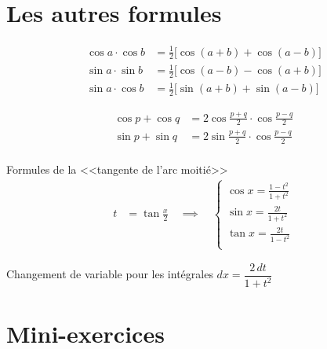 \section{Les autres formules}


\begin{frame}

\begin{align*}
\cos a\cdot\cos b &= \frac{1}{2}\big[ \cos(a+b)+\cos(a-b)\big]\\
\sin a\cdot\sin b &= \frac{1}{2}\big[ \cos(a-b)-\cos(a+b)\big]\\
\sin a\cdot\cos b &= \frac{1}{2}\big[ \sin(a+b)+\sin(a-b)\big]
\end{align*}

\pause
\bigskip

\begin{align*}
\cos p+\cos q &= 2\cos \frac{p+q}{2}\cdot\cos\frac{p-q}{2}\\
\sin p+\sin q &= 2\sin \frac{p+q}{2}\cdot\cos\frac{p-q}{2}\\
\end{align*}  
\end{frame}


\begin{frame}
Formules de la <<tangente de l'arc moitié>>
\begin{align*}
  t&=\tan \frac{x}{2}\quad \implies \quad 
\begin{cases}
    \cos x = \frac {1-t^2}{1+t^2} \\
    \sin x = \frac{2t}{1+t^2} \\
    \tan x = \frac{2t}{1-t^2} \\
\end{cases}
\end{align*}

\bigskip

Changement de variable pour les intégrales  $dx=\dfrac{2\,dt}{1+t^2}$
\end{frame}






\section{Mini-exercices}


